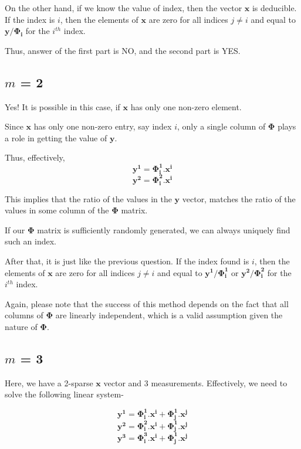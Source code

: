 \documentclass[a4paper,11pt]{article}
\numberwithin{definition}{section}
\numberwithin{mytheorem}{subsection}
\begin{document}
On the other hand, if we know the value of index, then the vector $\boldsymbol{x}$ is deducible. If the index is $i$, then the elements of $\boldsymbol{x}$ are zero for all indices $j\neq i$ and equal to $\boldsymbol{y/\Phi_i}$ for the $i^{th}$ index.

Thus, answer of the first part is NO, and the second part is YES.

\subsection{$m$ = 2}

Yes! It is possible in this case, if $\boldsymbol{x}$ has only one non-zero element.

Since $\boldsymbol{x}$ has only one non-zero entry, say index $i$, only a single column of $\boldsymbol{\Phi}$ plays a role in getting the value of $\boldsymbol{y}$.

Thus, effectively,
$$\boldsymbol{y^1} = \boldsymbol{\Phi_i^1.x^i}$$
$$\boldsymbol{y^2} = \boldsymbol{\Phi_i^2.x^i}$$

This implies that the ratio of the values in the $\boldsymbol{y}$ vector, matches the ratio of the values in some column of the $\boldsymbol{\Phi}$ matrix.

If our $\boldsymbol{\Phi}$ matrix is sufficiently randomly generated, we can always uniquely find such an index.

After that, it is just like the previous question. If the index found is $i$, then the elements of $\boldsymbol{x}$ are zero for all indices $j\neq i$ and equal to $\boldsymbol{y^1/\Phi_i^1}$ or $\boldsymbol{y^2/\Phi_i^2}$ for the $i^{th}$ index.

Again, please note that the success of this method depends on the fact that all columns of $\boldsymbol{\Phi}$ are linearly independent, which is a valid assumption given the nature of $\boldsymbol{\Phi}$.

\subsection{$m$ = 3}

Here, we have a 2-sparse $\boldsymbol{x}$ vector and 3 measurements.
Effectively, we need to solve the following linear system-

$$\boldsymbol{y^1} = \boldsymbol{\Phi_i^1.x^i + \Phi_j^1.x^j}$$
$$\boldsymbol{y^2} = \boldsymbol{\Phi_i^2.x^i + \Phi_j^1.x^j}$$
$$\boldsymbol{y^3} = \boldsymbol{\Phi_i^3.x^i + \Phi_j^1.x^j}$$
\end{document}
